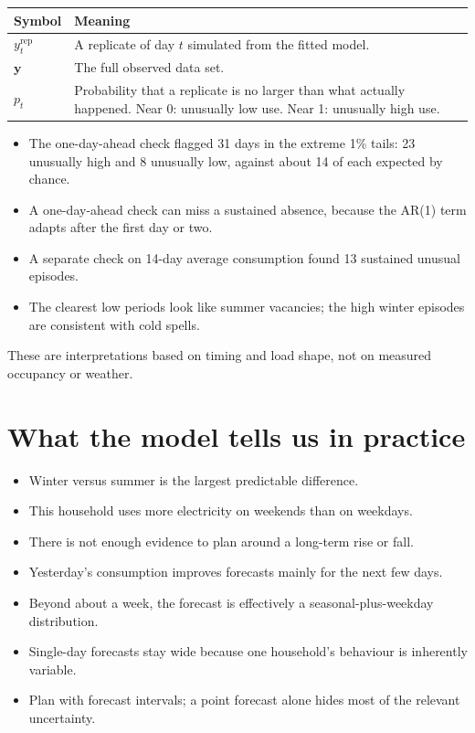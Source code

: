 \documentclass[11pt]{article}
\makeatletter
\newenvironment{reftable}[3]
  {\par\nopagebreak\addvspace{4pt}\noindent
   \renewcommand{\arraystretch}{1.3}%
   \begin{tabular}{@{}>{\raggedright\arraybackslash}p{#1\textwidth}
                      >{\raggedright\arraybackslash}p{\dimexpr0.97\textwidth-#1\textwidth-2\tabcolsep\relax}@{}}
   \toprule \textbf{#2} & \textbf{#3} \\ \midrule}
  {\bottomrule\end{tabular}\par\addvspace{8pt}}
\makeatother
\begin{document}
\begin{reftable}{0.2}{Symbol}{Meaning}
$y_t^{\mathrm{rep}}$ & A replicate of day $t$ simulated from the fitted model. \\
$\mathbf{y}$ & The full observed data set. \\
$p_t$ & Probability that a replicate is no larger than what actually happened. Near 0: unusually low use. Near 1: unusually high use. \\
\end{reftable}

\begin{itemize}[leftmargin=*]
\item The one-day-ahead check flagged 31 days in the extreme 1\% tails: 23
  unusually high and 8 unusually low, against about 14 of each expected by
  chance.
\item A one-day-ahead check can miss a sustained absence, because the AR(1)
  term adapts after the first day or two.
\item A separate check on 14-day average consumption found 13 sustained unusual
  episodes.
\item The clearest low periods look like summer vacancies; the high winter
  episodes are consistent with cold spells.
\end{itemize}
These are interpretations based on timing and load shape, not on measured
occupancy or weather.

\section{What the model tells us in practice}

\begin{itemize}[leftmargin=*]
\item Winter versus summer is the largest predictable difference.
\item This household uses more electricity on weekends than on weekdays.
\item There is not enough evidence to plan around a long-term rise or fall.
\item Yesterday's consumption improves forecasts mainly for the next few days.
\item Beyond about a week, the forecast is effectively a seasonal-plus-weekday
  distribution.
\item Single-day forecasts stay wide because one household's behaviour is
  inherently variable.
\item Plan with forecast intervals; a point forecast alone hides most of the
  relevant uncertainty.
\end{itemize}
\end{document}
